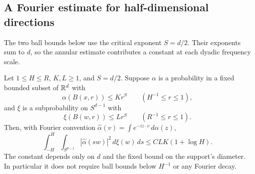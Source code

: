 \subsection{A Fourier estimate for half-dimensional directions}

The two ball bounds below use the critical exponent $S=d/2$.
Their exponents sum to $d$, so the annular estimate contributes a
constant at each dyadic frequency scale.

\begin{lemma}\label{test:half-dimensional-fourier}
Let $1\le H\le R$, $K,L\ge1$, and $S=d/2$.  Suppose $\alpha$ is a
probability in a fixed bounded subset of $\mathbb R^d$ with
\[
\alpha(B(x,r))\le Kr^S\qquad(H^{-1}\le r\le1),
\]
and $\xi$ is a subprobability on $S^{d-1}$ with
\[
\xi(B(w,r))\le Lr^S\qquad(R^{-1}\le r\le1).
\]
Then, with Fourier convention
$\widehat\alpha(v)=\int e^{-iz\cdot v}\,d\alpha(z)$,
\begin{equation}\label{test:fourier-estimate}
\int_{-H}^{H}\int_{S^{d-1}}|\widehat\alpha(sw)|^2\,d\xi(w)\,ds
 \le C LK(1+\log H).
\end{equation}
The constant depends only on $d$ and the fixed bound on the support's
diameter.  In particular it does not require ball bounds below
$H^{-1}$ or any Fourier decay.
\end{lemma}

